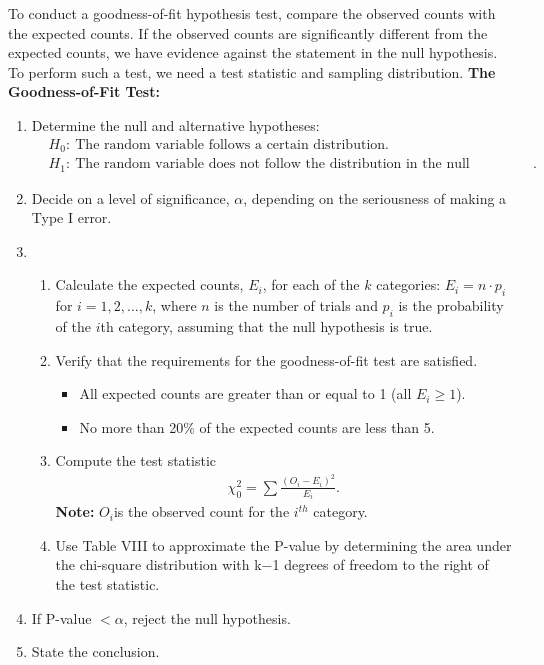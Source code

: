 \documentclass{report}
\begin{document}
    \bigbreak \noindent 
    To conduct a goodness-of-fit hypothesis test, compare the observed counts with the expected counts. If the observed counts are significantly different from the expected counts, we have evidence against the statement in the null hypothesis. To perform such a test, we need a test statistic and sampling distribution.
    \bigbreak \noindent 
    \textbf{The Goodness-of-Fit Test:}
    \begin{enumerate}
        \item Determine the null and alternative hypotheses:
            \begin{align*}
                &H_{0}:\ \text{The random variable follows a certain distribution.} \\
                &H_{1}:\ \text{The random variable does not follow the distribution in the null hypothesis.}
            .\end{align*}
        \item  Decide on a level of significance, $\alpha$, depending on the seriousness of making a Type I error.
        \item \begin{enumerate}[label=\alph*.)]
            \item Calculate the expected counts, \(E_i\), for each of the \(k\) categories: \(E_i = n \cdot p_i\) for \(i = 1, 2, \ldots, k\), where \(n\) is the number of trials and \(p_i\) is the probability of the \(i\)th category, assuming that the null hypothesis is true.
            \item  Verify that the requirements for the goodness-of-fit test are satisfied.
                \begin{itemize}
                    \item All expected counts are greater than or equal to 1 (all $E_{i} \geq 1$).
                    \item No more than 20\% of the expected counts are less than 5.
                \end{itemize}
            \item  Compute the test statistic
                \begin{align*}
                    \chi^{2}_{0} = \sum \frac{(O_{i}-E_{i})^{2}}{E_{i}}
                .\end{align*}
            \textbf{Note:} $O_{i} $is the observed count for the $i^{th}$ category.
            \item Use Table VIII to approximate the P-value by determining the area under the chi-square distribution with k−1 degrees of freedom to the right of the test statistic.
        \end{enumerate}
        \item If P-value $<\alpha$, reject the null hypothesis.
        \item  State the conclusion.
    \end{enumerate}
\end{document}
